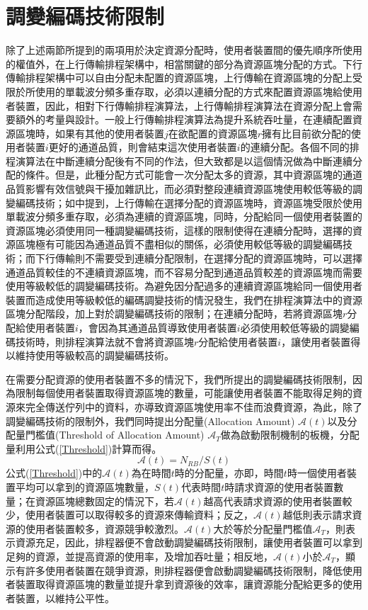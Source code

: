\section{調變編碼技術限制}
除了上述兩節所提到的兩項用於決定資源分配時，使用者裝置間的優先順序所使用的權值外，在上行傳輸排程架構中，相當關鍵的部分為資源區塊分配的方式。下行傳輸排程架構中可以自由分配未配置的資源區塊，上行傳輸在資源區塊的分配上受限於所使用的單載波分頻多重存取，必須以連續分配的方式來配置資源區塊給使用者裝置，因此，相對下行傳輸排程演算法，上行傳輸排程演算法在資源分配上會需要額外的考量與設計。一般上行傳輸排程演算法為提升系統吞吐量，在連續配置資源區塊時，如果有其他的使用者裝置$j$在欲配置的資源區塊$r$擁有比目前欲分配的使用者裝置$i$更好的通道品質，則會結束這次使用者裝置$i$的連續分配。各個不同的排程演算法在中斷連續分配後有不同的作法，但大致都是以這個情況做為中斷連續分配的條件。但是，此種分配方式可能會一次分配太多的資源，其中資源區塊的通道品質影響有效信號與干擾加雜訊比，而必須對整段連續資源區塊使用較低等級的調變編碼技術；如\cite{kess2012}中提到，上行傳輸在選擇分配的資源區塊時，資源區塊受限於使用單載波分頻多重存取，必須為連續的資源區塊，同時，分配給同一個使用者裝置的資源區塊必須使用同一種調變編碼技術，這樣的限制使得在連續分配時，選擇的資源區塊極有可能因為通道品質不盡相似的關係，必須使用較低等級的調變編碼技術；而下行傳輸則不需要受到連續分配限制，在選擇分配的資源區塊時，可以選擇通道品質較佳的不連續資源區塊，而不容易分配到通道品質較差的資源區塊而需要使用等級較低的調變編碼技術。為避免因分配過多的連續資源區塊給同一個使用者裝置而造成使用等級較低的編碼調變技術的情況發生，我們在排程演算法中的資源區塊分配階段，加上對於調變編碼技術的限制；在連續分配時，若將資源區塊$r$分配給使用者裝置$i$，會因為其通道品質導致使用者裝置$i$必須使用較低等級的調變編碼技術時，則排程演算法就不會將資源區塊$r$分配給使用者裝置$i$，讓使用者裝置得以維持使用等級較高的調變編碼技術。

在需要分配資源的使用者裝置不多的情況下，我們所提出的調變編碼技術限制，因為限制每個使用者裝置取得資源區塊的數量，可能讓使用者裝置不能取得足夠的資源來完全傳送佇列中的資料，亦導致資源區塊使用率不佳而浪費資源，為此，除了調變編碼技術的限制外，我們同時提出分配量(Allocation Amount) $\mathcal{A}(t)$以及分配量門檻值(Threshold of Allocation Amount) $\mathcal{A}_T$做為啟動限制機制的板機，分配量利用公式(\ref{Threshold})計算而得。
\begin{equation}
\label{Threshold}
\mathcal{A}(t)=N_{RB}/S(t)
\end{equation}
公式(\ref{Threshold})中的$\mathcal{A}(t)$為在時間$t$時的分配量，亦即，時間$t$時一個使用者裝置平均可以拿到的資源區塊數量，$S(t)$代表時間$t$時請求資源的使用者裝置數量；在資源區塊總數固定的情況下，若$\mathcal{A}(t)$越高代表請求資源的使用者裝置較少，使用者裝置可以取得較多的資源來傳輸資料；反之，$\mathcal{A}(t)$越低則表示請求資源的使用者裝置較多，資源競爭較激烈。$\mathcal{A}(t)$大於等於分配量門檻值$\mathcal{A}_T$，則表示資源充足，因此，排程器便不會啟動調變編碼技術限制，讓使用者裝置可以拿到足夠的資源，並提高資源的使用率，及增加吞吐量；相反地，$\mathcal{A}(t)$小於$\mathcal{A}_T$，顯示有許多使用者裝置在競爭資源，則排程器便會啟動調變編碼技術限制，降低使用者裝置取得資源區塊的數量並提升拿到資源後的效率，讓資源能分配給更多的使用者裝置，以維持公平性。
\clearpage
